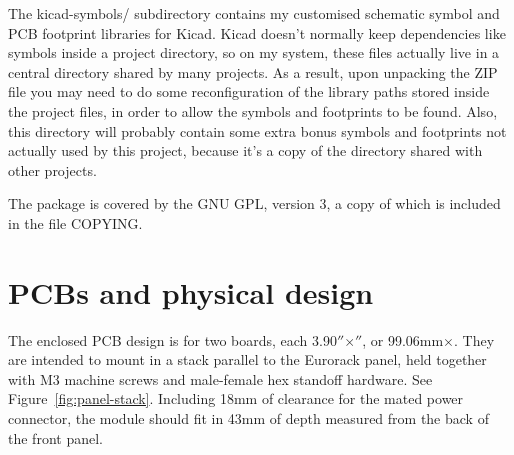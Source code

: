 The kicad-symbols/ subdirectory contains my customised schematic symbol and PCB
footprint libraries for Kicad.  Kicad doesn't normally keep dependencies
like symbols inside a project directory, so on my system, these files
actually live in a central directory shared by many projects.  As a result,
upon unpacking the ZIP file you may need to do some reconfiguration of the
library paths stored inside the project files, in order to allow the symbols
and footprints to be found.  Also, this directory will probably contain some
extra bonus symbols and footprints not actually used by this project,
because it's a copy of the directory shared with other projects.

The package is covered by the GNU GPL, version 3, a copy of which is
included in the file COPYING.

\section{PCBs and physical design}

The enclosed PCB design is for two boards, each
3.90$''$\linebreak[0]$\times$$''$, or
99.06mm\linebreak[0]$\times$\linebreak[0]38.10mm.  They are intended to
mount in a stack parallel to the Eurorack panel, held together with M3
machine screws and male-female hex standoff hardware.  See
Figure~\ref{fig:panel-stack}.  Including 18mm of clearance for the mated
power connector, the module should fit in 43mm of depth measured from the
back of the front panel.

